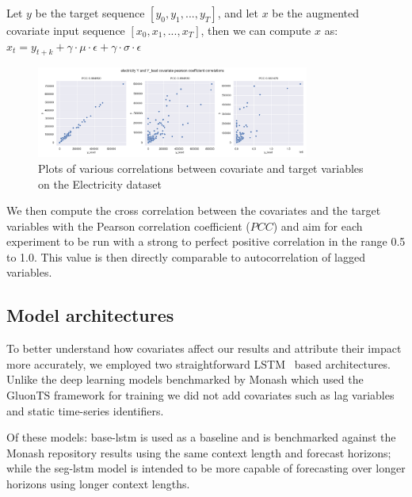 \documentclass{article}
\newcommand{\timeserieslength}{T}
\newcommand{\pearson}{PCC}
\begin{document}
Let $y$ be the target sequence $[y_0, y_1, ..., y_T]$, and let $x$ be the augmented covariate input sequence $[x_0, x_1, ..., x_T]$, 
then we can compute $x$ as: $x_t = y_{t+k} + \gamma \cdot \mu \cdot \epsilon + \gamma \cdot \sigma \cdot \epsilon $


\begin{figure}[ht]
\centering
\includegraphics[width=0.8\textwidth]{figures/electricity-pcc.png}
\caption{Plots of various correlations between covariate and target variables on the Electricity dataset}
\label{fig:my_label}
\end{figure}

We then compute the cross correlation between the covariates and the target variables with the Pearson correlation coefficient ($\pearson$) 
and aim for each experiment to be run with a strong to perfect positive correlation in the range 0.5 to 1.0. This value is then directly 
comparable to autocorrelation of lagged variables.



\subsection{Model architectures}
To better understand how covariates affect our results and attribute their impact more accurately, 
we employed two straightforward LSTM~\cite{HochSchm97} based architectures. Unlike the deep learning models benchmarked 
by Monash \cite{DBLP:conf/nips/GodahewaBWHM21} which used the GluonTS \cite{gluonts_arxiv} framework 
for training we did not add covariates such as lag variables and static time-series identifiers. 

Of these models: base-lstm is used as a baseline and is benchmarked against the Monash repository results using the same context length
and forecast horizons; while the seg-lstm model is intended to be more capable of forecasting over longer horizons using longer context lengths.
\end{document}
